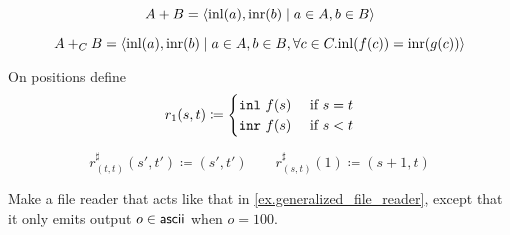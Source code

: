 \documentclass[Book-Poly]{subfiles}
\begin{document}
\begin{example}
\[A + B = \langle \mathrm{inl}(a), \mathrm{inr}(b) \mid a \in A, b \in B \rangle\]

\[A +_C B = \langle \mathrm{inl}(a), \mathrm{inr}(b) \mid a \in A, b \in B, \forall c
\in C.
\mathrm{inl}(f(c)) = \mathrm{inr}(g(c)) \rangle\]


On positions define
\[
	r_1(s,t)\coloneqq
	\begin{cases}
		\texttt{inl}\ f(s)&\textnormal{ if } s=t\\
		\texttt{inr}\ f(s)&\textnormal{ if } s<t
	\end{cases}
\]

\[
	r^\sharp_{(t,t)}(s',t')\coloneqq (s',t')
	\qquad
	r^\sharp_{(s,t)}(1)\coloneqq (s+1,t)
\]
\end{example}

\begin{exercise}
Make a file reader that acts like that in \cref{ex.generalized_file_reader}, except that it only emits output $o\in\mathsf{ascii}$ when $o=100$.
\end{exercise}
\end{document}

